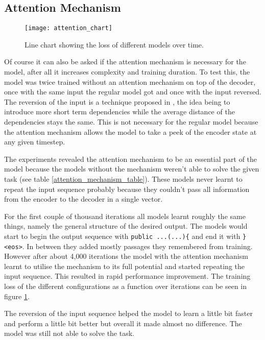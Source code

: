 \subsection{Attention Mechanism}

\begin{figure}[p]
\centering
\texttt{[image: attention\_chart]}
\caption{Line chart showing the loss of different models over time.}
\label{attention_chart}
\end{figure}

Of course it can also be asked if the attention mechanism is necessary for the model, after all it increases complexity and training duration. To test this, the model was twice trained without an attention mechanism on top of the decoder, once with the same input the regular model got and once with the input reversed. The reversion of the input is a technique proposed in \cite{seq2seq}, the idea being to introduce more short term dependencies while the average distance of the dependencies stays the same. This is not necessary for the regular model because the attention mechanism allows the model to take a peek of the encoder state at any given timestep.

The experiments revealed the attention mechanism to be an essential part of the model because the models without the mechanism weren't able to solve the given task (see table \ref{attention_mechanism_table}). These models never learnt to repeat the input sequence probably because they couldn't pass all information from the encoder to the decoder in a single vector.

For the first couple of thousand iterations all models learnt roughly the same things, namely the general structure of the desired output. The models would start to begin the output sequence with \texttt{public ...(...)\{} and end it with \texttt{\}<eos>}. In between they added mostly passages they remembered from training. However after about 4,000 iterations the model with the attention mechanism learnt to utilise the mechanism to its full potential and started repeating the input sequence. This resulted in rapid performance improvement. The training loss of the different configurations as a function over iterations can be seen in figure \ref{attention_chart}.

The reversion of the input sequence helped the model to learn a little bit faster and perform a little bit better but overall it made almost no difference. The model was still not able to solve the task.

